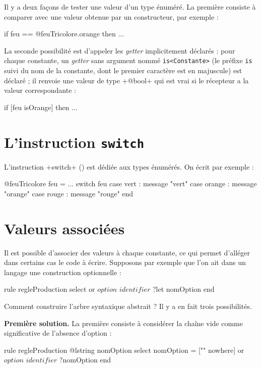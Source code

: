 
Il y a deux façons de tester une valeur d'un type énuméré. La première consiste à comparer avec une valeur obtenue par un constructeur, par exemple :
\begin{galgas}
  if feu == @feuTricolore.orange then ...
\end{galgas}

La seconde possibilité est d'appeler les \emph{getter} implicitement déclarés : pour chaque constante, un \emph{getter} sans argument nommé  \texttt{is<Constante>} (le préfixe \texttt{is} suivi du nom de la constante, dont le premier caractère est en majuscule) est déclaré ; il renvoie une valeur de type \ggs+@bool+ qui est vrai si le récepteur a la valeur correspondante :
\begin{galgas}
  if [feu isOrange] then ...
\end{galgas}

\section{L'instruction \texttt{switch}}

L'instruction \ggs+switch+ () est dédiée aux types énumérés. On écrit par exemple :

\begin{galgas}
@feuTricolore feu = ...
switch feu
case vert : message "vert"
case orange : message "orange"
case rouge : message "rouge" 
end
\end{galgas}


\section{Valeurs associées}

Il est possible d'associer des valeurs à chaque constante, ce qui permet d'alléger dans certains cas le code à écrire. Supposons par exemple que l'on ait dans un langage une construction optionnelle :

\begin{galgas}
rule regleProduction {
  select
  or
    $option$
    $identifier$ ?let nomOption
  end
}
\end{galgas}

Comment construire l'arbre syntaxique abstrait ? Il y a en fait trois possibilités.

\textbf{Première solution.} La première consiste à considérer la chaîne vide comme significative de l'absence d'option :
\begin{galgas}
rule regleProduction {
  @lstring nomOption
  select
    nomOption = ["" nowhere]
  or
    $option$
    $identifier$ ?nomOption
  end
}
\end{galgas}

